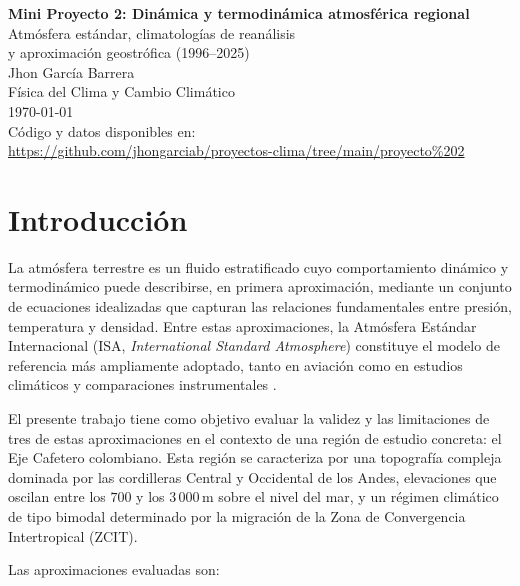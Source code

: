 \documentclass[12pt, a4paper]{article}
\begin{document}
	
	\begin{titlepage}
		\centering
		\vspace*{2cm}
		{\LARGE \textbf{Mini Proyecto 2: Dinámica y termodinámica atmosférica regional}\\[0.5em]
			\large Atmósfera estándar, climatologías de reanálisis\\
			y aproximación geostrófica (1996--2025)}\\[2cm]
		{\large Jhon García Barrera}\\[0.5em]
		{\normalsize Física del Clima y Cambio Climático}\\[0.5em]
		{\normalsize \today}\\[3cm]
		\vfill
		{\small Código y datos disponibles en:\\
			\url{https://github.com/jhongarciab/proyectos-clima/tree/main/proyecto%202}}
	\end{titlepage}
	
	\tableofcontents
	\newpage

\section{Introducción}
\label{sec:intro}

La atmósfera terrestre es un fluido estratificado cuyo comportamiento
dinámico y termodinámico puede describirse, en primera aproximación,
mediante un conjunto de ecuaciones idealizadas que capturan las
relaciones fundamentales entre presión, temperatura y densidad.
Entre estas aproximaciones, la Atmósfera Estándar Internacional
(ISA, \textit{International Standard Atmosphere}) constituye el modelo
de referencia más ampliamente adoptado, tanto en aviación como en
estudios climáticos y comparaciones instrumentales
\citep{iso1975standard}.

El presente trabajo tiene como objetivo evaluar la validez y las
limitaciones de tres de estas aproximaciones en el contexto de una
región de estudio concreta: el Eje Cafetero colombiano.
Esta región se caracteriza por una topografía compleja dominada por
las cordilleras Central y Occidental de los Andes, elevaciones que
oscilan entre los $700$ y los $3\,000$\,m sobre el nivel del mar, y
un régimen climático de tipo bimodal determinado por la migración de
la Zona de Convergencia Intertropical (ZCIT).

Las aproximaciones evaluadas son:
\end{document}
